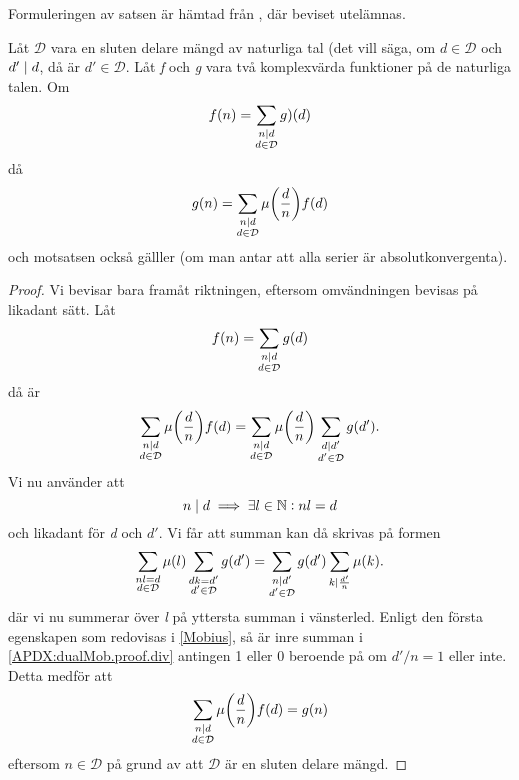 Formuleringen av satsen är hämtad från \cite[Sats 1.2.3]{cojocarumurty}, där beviset utelämnas.
\begin{theorem}\label{APDX:mobDual}
Låt \(\mathcal{D}\) vara en sluten delare mängd av naturliga tal (det vill säga, om \(d \in \mathcal{D}\) och \(d'\mid d\), då är \(d'\in \mathcal{D}\). Låt \textit{f} och \textit{g} vara två komplexvärda funktioner på de naturliga talen. Om
\begin{equation}
    f(n)=\sum_{\substack{n\mid d\\d\in \mathcal{D}}}g)(d)\nonumber
\end{equation}
då
\begin{equation}
    g(n) = \sum_{\substack{n\mid d\\d\in \mathcal{D}}}\mu\bigg(\frac{d}{n}\bigg)f(d)\nonumber
\end{equation}
och motsatsen också gälller (om man antar att alla serier är absolutkonvergenta).
\end{theorem}
\begin{proof}
Vi bevisar bara framåt riktningen, eftersom omvändningen  bevisas  på likadant sätt. Låt
\begin{equation}
    f(n)=\sum_{\substack{n\mid d\\d\in \mathcal{D}}}g(d)\nonumber
\end{equation}
då är
\begin{equation}
    \sum_{\substack{n\mid d\\d\in \mathcal{D}}}\mu\bigg(\frac{d}{n}\bigg)f(d) = \sum_{\substack{n\mid d\\d\in \mathcal{D}}}\mu\bigg(\frac{d}{n}\bigg)\sum_{\substack{d\mid d'\\d'\in \mathcal{D}}}g(d').\nonumber
\end{equation}
Vi nu använder att
\begin{equation}
    n\mid d \implies \exists l\in\mathbb{N}:nl = d\nonumber
\end{equation}
och likadant för \textit{d} och \(d'\). Vi får att summan kan då skrivas på formen
\begin{equation}
    \sum_{\substack{nl = d\\d\in \mathcal{D}}}\mu(l)\sum_{\substack{dk= d'\\d'\in \mathcal{D}}}g(d') = \sum_{\substack{n \mid d'\\d'\in \mathcal{D}}}g(d')\sum_{k\mid \frac{d'}{n}}\mu(k).\label{APDX:dualMob.proof.div}
\end{equation}
där vi nu summerar över \textit{l} på yttersta summan i vänsterled. Enligt den första egenskapen som redovisas i \ref{Mobius}, så är inre summan i \eqref{APDX:dualMob.proof.div} antingen 1 eller 0 beroende på om \(d'/n = 1\) eller inte. Detta medför att
\begin{equation}
     \sum_{\substack{n\mid d\\d\in \mathcal{D}}}\mu\bigg(\frac{d}{n}\bigg)f(d) = g(n)\nonumber
\end{equation}
eftersom \(n \in \mathcal{D}\) på grund av att \(\mathcal{D}\) är en sluten delare mängd.
\end{proof}